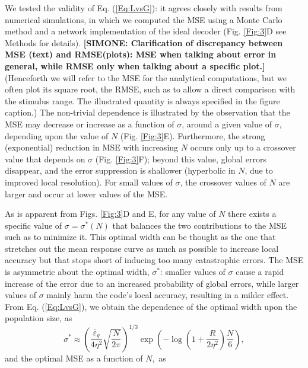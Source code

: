 \documentclass[a4paper]{article}%
\begin{document}
We tested the validity of Eq. (\ref{Eq:LvsG}): it agrees closely with results
from numerical simulations, in which we computed the MSE using a Monte Carlo
method and a network implementation of the ideal decoder (Fig. \ref{Fig:3}D
see Methods for details).  \textbf{[SIMONE: Clarification of discrepancy between MSE (text) and RMSE(plots): MSE when talking about error in general, while RMSE only when talking about a specific plot.]}(Henceforth we will refer to the MSE for the analytical computations, but we often plot its square root, the RMSE, such as to allow a direct comparison with the stimulus range. The illustrated quantity is always specified in the figure caption.) The non-trivial dependence is illustrated by the
observation that the MSE  may decrease or increase as a function of
$\sigma$, around a given value of $\sigma$, depending upon the value of $N$
(Fig. \ref{Fig:3}E). Furthermore, the strong (exponential) reduction in MSE
with increasing $N$ occurs only up to a crossover value that depends on
$\sigma$ (Fig. \ref{Fig:3}F); beyond this value, global errors disappear, and
the error suppression is shallower (hyperbolic in $N$, due to improved local
resolution). For small values of $\sigma$, the crossover values of $N$ are
larger and occur at lower values of the MSE.

As is apparent from Figs. \ref{Fig:3}D and E, for any value of $N$ there
exists a specific value of $\sigma=\sigma^{\ast}\left(  N\right)  $ that
balances the two contributions to the MSE such as to minimize it. This optimal
width can be thought as the one that stretches out the mean response curve as
much as possible to increase local accuracy but that stops short of inducing
too many catastrophic errors. The MSE is asymmetric about the optimal width,
$\sigma^{\ast}$: smaller values of $\sigma$ cause a rapid increase of the
error due to an increased probability of global errors, while larger values of
$\sigma$ mainly harm the code's local accuracy, resulting in a milder effect.
From Eq. (\ref{Eq:LvsG}), we obtain the dependence of the optimal width upon
the population size, as
\begin{equation}
\sigma^{\ast}\approx\left(  \frac{\bar{\varepsilon}_{g}}{4\eta^{2}}\sqrt
{\frac{N}{2\pi}}\right)  ^{1/3}\exp\left(  {-\log\left(  {1+\frac{R}{2\eta
^{2}}}\right)  \frac{N}{6}}\right)  , \label{Sigma_opt}%
\end{equation}
and the optimal MSE as a function of $N,$ as
\end{document}

